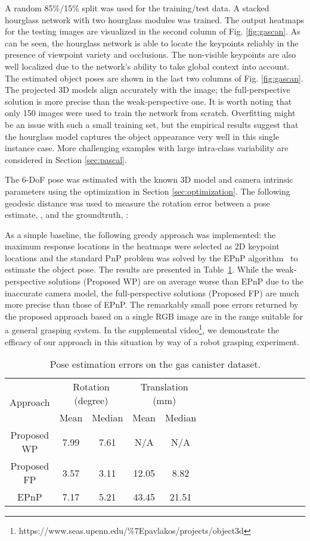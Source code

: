 \documentclass[letterpaper, 10 pt, conference]{ieeeconf}
\begin{document}
A random 85\%/15\% split was used for the training/test data. A stacked hourglass network with two hourglass modules was trained. The output heatmaps for the testing images are visualized in the second column of Fig. \ref{fig:gascan}.  As can be seen, the hourglass network is able to locate the keypoints reliably in the presence of viewpoint variety and occlusions. The non-visible keypoints are also well localized due to the network's ability to take global context into account. The estimated object poses are shown in the last two columns of Fig. \ref{fig:gascan}. The projected 3D models align accurately with the image; the full-perspective solution is more precise than the weak-perspective one. It is worth noting that only 150 images were used to train the network from scratch. Overfitting might be an issue with such a small training set, but the empirical results suggest that the hourglass model captures the object appearance very well in this single instance case. More challenging examples with large intra-class variability are considered in Section \ref{sec:pascal}. 

The 6-DoF pose was estimated with the known 3D model and camera intrinsic parameters using the optimization in Section \ref{sec:optimization}. The following geodesic distance was used to measure the rotation error between a pose estimate, , and the groundtruth, : 

As a simple baseline, the following greedy approach was implemented: the maximum response locations in the heatmaps were selected as 2D keypoint locations and the standard PnP problem was solved by the EPnP algorithm~\cite{lepetit2009} to estimate the object pose. The results are presented in Table~\ref{tab:gas}. While the weak-perspective solutions (Proposed WP) are on average worse than EPnP due to the inaccurate camera model, the full-perspective solutions (Proposed FP) are much more precise than those of EPnP.  The remarkably small pose errors returned by the proposed approach based on a single RGB image are in the range suitable for a general grasping system. In the supplemental video\footnote{https://www.seas.upenn.edu/\%7Epavlakos/projects/object3d}, we demonstrate the efficacy of our approach in this situation by way of a robot grasping experiment. 

\begin{table}
\caption{Pose estimation errors on the gas canister dataset.}
\centering
\renewcommand{\arraystretch}{1.2}
\begin{tabular}{c*{15}{c}}
\hline
 \multirow{2}{*}{Approach}& \multicolumn{2}{c}{Rotation (degree)} & \multicolumn{2}{c}{Translation (mm)} \\
& Mean & Median & Mean & Median \\
\hline
Proposed WP & 7.99 & 7.61 & N/A & N{}/A \\
Proposed FP & 3.57 & 3.11 & 12.05 & 8.82 \\
EPnP \cite{lepetit2009} & 7.17 & 5.21 & 43.45 & 21.51 \\
\hline
\end{tabular}
\vspace{0.25em}
\label{tab:gas}
\end{table}{}
\end{document}
